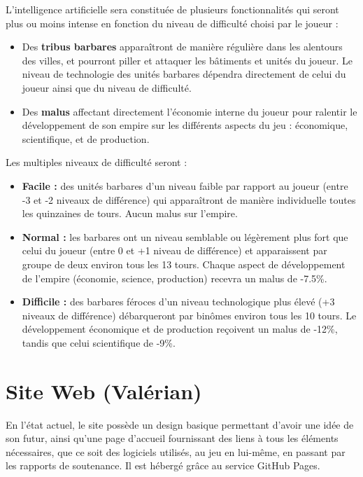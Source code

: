\documentclass[12pt]{report}
\begin{document}
L’intelligence artificielle sera constituée de plusieurs fonctionnalités qui seront plus ou moins intense en fonction du niveau de difficulté choisi par le joueur :

\begin{itemize}[label=\textbullet]
	\item Des \textbf{tribus barbares} apparaîtront de manière régulière dans les alentours des villes, et pourront piller et attaquer les bâtiments et unités du joueur. Le niveau de technologie des unités barbares dépendra directement de celui du joueur ainsi que du niveau de difficulté.
	\item Des \textbf{malus} affectant directement l’économie interne du joueur pour ralentir le développement de son empire sur les différents aspects du jeu : économique, scientifique, et de production.
\end{itemize}

Les multiples niveaux de difficulté seront :

\begin{itemize}[label=\textbullet]
    \item \textbf{Facile :} des unités barbares d'un niveau faible par rapport au joueur (entre -3 et -2 niveaux de différence) qui apparaîtront de manière individuelle toutes les quinzaines de tours. Aucun malus sur l'empire.
    \item \textbf{Normal :} les barbares ont un niveau semblable ou légèrement plus fort que celui du joueur (entre 0 et +1 niveau de différence) et apparaissent par groupe de deux environ tous les 13 tours. Chaque aspect de développement de l'empire (économie, science, production) recevra un malus de -7.5\%.
    \item \textbf{Difficile :} des barbares féroces d'un niveau technologique plus élevé (+3 niveaux de différence) débarqueront par binômes environ tous les 10 tours. Le développement économique et de production reçoivent un malus de -12\%, tandis que celui scientifique de -9\%.
\end{itemize}

\section{Site Web (Valérian)}

En l’état actuel, le site possède un design basique permettant d’avoir une idée de son futur, ainsi qu’une page d’accueil fournissant des liens à tous les éléments nécessaires, que ce soit des logiciels utilisés, au jeu en lui-même, en passant par les rapports de soutenance. Il est hébergé grâce au service GitHub Pages.
\end{document}
